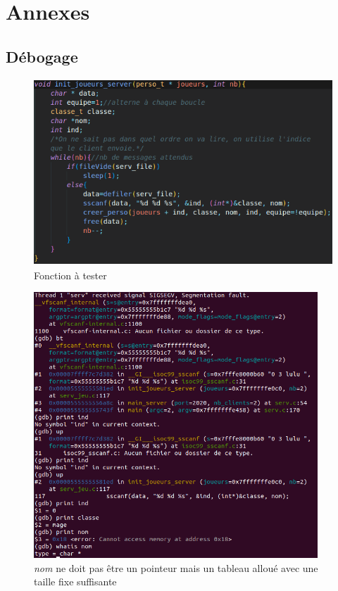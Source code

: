 \documentclass[11pt]{article}
\begin{document}
    \newpage
    \section{Annexes}
        \subsection{Débogage}
        
        \begin{figure}[H]
            \centering
            \includegraphics[height=7cm]{fonction.png}
            \caption{Fonction à tester}
            \label{fig:Mob}
        \end{figure}
        \begin{figure}[H]
            \centering
            \includegraphics[height=10cm]{gdb.png}
            \caption{\textit{nom} ne doit pas être un pointeur mais un tableau alloué avec une taille fixe suffisante}
        \end{figure}
\end{document}
